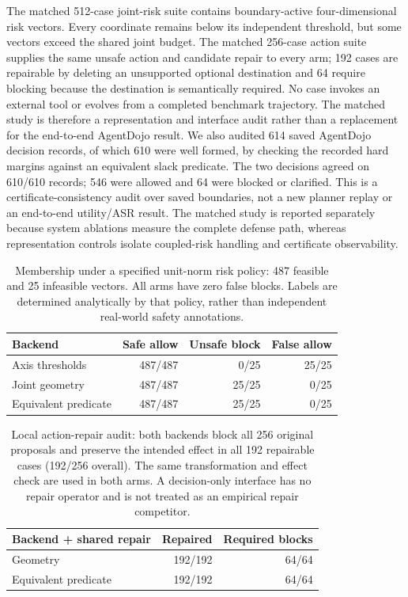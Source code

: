 \documentclass[letterpaper]{article}
\begin{document}
The matched 512-case joint-risk suite contains boundary-active four-dimensional risk vectors. Every coordinate remains below its independent threshold, but some vectors exceed the shared joint budget. The matched 256-case action suite supplies the same unsafe action and candidate repair to every arm; 192 cases are repairable by deleting an unsupported optional destination and 64 require blocking because the destination is semantically required. No case invokes an external tool or evolves from a completed benchmark trajectory. The matched study is therefore a representation and interface audit rather than a replacement for the end-to-end AgentDojo result. We also audited 614 saved AgentDojo decision records, of which 610 were well formed, by checking the recorded hard margins against an equivalent slack predicate. The two decisions agreed on 610/610 records; 546 were allowed and 64 were blocked or clarified. This is a certificate-consistency audit over saved boundaries, not a new planner replay or an end-to-end utility/ASR result. The matched study is reported separately because system ablations measure the complete defense path, whereas representation controls isolate coupled-risk handling and certificate observability.

\begin{table}[ht]
\centering\small
\setlength{\tabcolsep}{3pt}
\begin{tabular}{lrrr}
\toprule
Backend & Safe allow & Unsafe block & False allow\\
\midrule
Axis thresholds & 487/487 & 0/25 & 25/25\\
Joint geometry & 487/487 & 25/25 & 0/25\\
Equivalent predicate & 487/487 & 25/25 & 0/25\\
\bottomrule
\end{tabular}
\caption{Membership under a specified unit-norm risk policy: 487 feasible and 25 infeasible vectors. All arms have zero false blocks. Labels are determined analytically by that policy, rather than independent real-world safety annotations.}
\label{tab:geometry-representation}
\end{table}

\begin{table}[ht]
\centering\small
\setlength{\tabcolsep}{3pt}
\begin{tabular}{lrr}
\toprule
Backend + shared repair & Repaired & Required blocks\\
\midrule
Geometry & 192/192 & 64/64\\
Equivalent predicate & 192/192 & 64/64\\
\bottomrule
\end{tabular}
\caption{Local action-repair audit: both backends block all 256 original proposals and preserve the intended effect in all 192 repairable cases (192/256 overall). The same transformation and effect check are used in both arms. A decision-only interface has no repair operator and is not treated as an empirical repair competitor.}
\label{tab:repair-interface}
\end{table}
\end{document}

